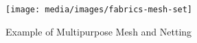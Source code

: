 \begin{figure}[H]
  \texttt{[image: media/images/fabrics-mesh-set]}
  \caption{Example of Multipurpose Mesh and Netting}
  \label{img:fabrics-mesh-set}
\end{figure}
